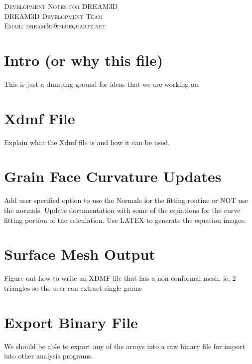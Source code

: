 \documentclass[12pt]{article} %
\begin{document}
\begin{center}
\textsc{\huge Development Notes for DREAM3D}\\[1.5cm]
\textsc{\large DREAM3D Development Team\\
Email: dream3d@bluequartz.net}\\[1.5cm]
\end{center}

{}
\section{Intro (or why this file)}
  This is just a dumping ground for ideas that we are working on.
  
\section{Xdmf File}
  Explain what the Xdmf file is and how it can be used.

\section{Grain Face Curvature Updates}
	Add user specified option to use the Normals for the fitting routine or NOT use the normals. Update documentation with some of the equations for the curve fitting portion of the calculation. Use LATEX to generate the equation images.

\section{Surface Mesh Output}
	Figure out how to write an XDMF file that has a non-conformal mesh, ie, 2 triangles so the user can extract single grains

\section{Export Binary File}
  We should be able to export any of the arrays into a raw binary file for import into other analysis programs. 
  
\end{document}
